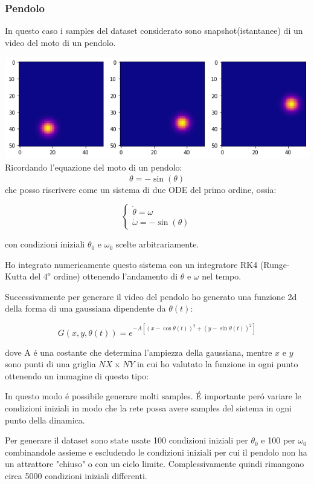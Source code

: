 \documentclass[11pt]{article}
\begin{document}
\subsubsection{Pendolo}
In questo caso i samples del dataset considerato sono snapshot(istantanee) di un video del moto di un pendolo.

\includegraphics[width=\textwidth]{pendulum_motion}
Ricordando l'equazione del moto di un pendolo:
$$ \ddot{\theta} = - \sin(\theta) $$
che posso riscrivere come un sistema di due ODE del primo ordine, ossia:

$$
\begin{cases} 
\dot{\theta} = \omega \\ 
\dot{\omega} = - \sin(\theta)
\end{cases}
$$

con condizioni iniziali $\theta_0$ e $\omega_0$ scelte arbitrariamente.

Ho integrato numericamente questo sistema con un integratore RK4 (Runge-Kutta del $4^o$ ordine) ottenendo l'andamento di $\theta$ e $\omega$ nel tempo.

Successivamente per generare il video del pendolo ho generato una funzione 2d della forma di una gaussiana dipendente da $\theta(t)$:


$$G(x,y,\theta(t)) = e^{-A[(x - \cos{\theta(t)})^2 + (y - \sin{\theta(t)})^2]}$$

dove A é una costante che determina l'ampiezza della gaussiana, mentre $x$ e $y$ sono punti di una griglia $NX$ x $NY$ in cui ho valutato la funzione in ogni punto ottenendo un immagine di questo tipo:

In questo modo é possibile generare molti samples.
É importante peró variare le condizioni iniziali in modo che la rete possa avere samples del sistema in ogni punto della dinamica.

Per generare il dataset sono state usate 100 condizioni iniziali per $\theta_0$ e 100 per $\omega_0$ combinandole assieme e escludendo le condizioni iniziali per cui il pendolo non ha un attrattore "chiuso" o con un ciclo limite. Complessivamente quindi rimangono circa 5000 condizioni iniziali differenti.
\end{document}
